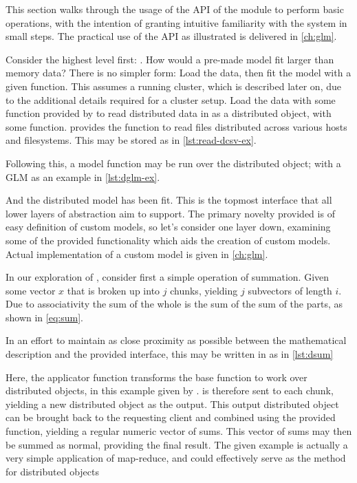 This section walks through the usage of the API of the \lso module to perform basic operations, with the intention of granting intuitive familiarity with the system in small steps.
The practical use of the API as illustrated is delivered in \cref{ch:glm}.

Consider the highest level first: \lsm.
How would a pre-made model fit larger than memory data?
There is no simpler form: Load the data, then fit the model with a given function.
This assumes a running cluster, which is described later on, due to the additional details required for a cluster setup.
Load the data with some function provided by \lso to read distributed data in as a distributed object, with some  function.
\lso provides the  function to read  files distributed across various hosts and filesystems.
This may be stored as in \cref{lst:read-dcsv-ex}.


Following this, a model function may be run over the distributed object; with a GLM as an example in \cref{lst:dglm-ex}.


And the distributed model has been fit.
This is the topmost interface that all lower layers of abstraction aim to support.
The primary novelty provided is of easy definition of custom models, so let's consider one layer down, examining some of the provided functionality which aids the creation of custom models.
Actual implementation of a custom model is given in \cref{ch:glm}.

In our exploration of \lso, consider first a simple operation of summation.
Given some vector $x$ that is broken up into $j$ chunks, yielding $j$ subvectors of length $i$.
Due to associativity the sum of the whole is the sum of the sum of the parts, as shown in \cref{eq:sum}.


In an effort to maintain as close proximity as possible between the mathematical description and the provided interface, this may be written in \lso as in \cref{lst:dsum}


Here, the  applicator function transforms the base  function to work over distributed objects, in this example given by .
 is therefore sent to each chunk, yielding a new distributed object as the output.
This output distributed object can be brought back to the requesting client and combined using the provided  function, yielding a regular \R numeric vector of sums.
This vector of sums may then be summed as normal, providing the final result.
The given example is actually a very simple application of map-reduce, and could effectively serve as the  method for distributed objects


